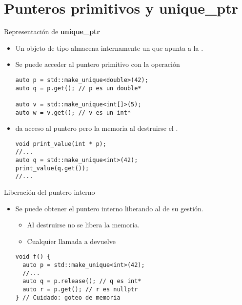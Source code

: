\section{Punteros primitivos y \textbf{unique\_ptr}}

\begin{frame}[t,fragile]{Representación de \textbf{unique\_ptr}}
\begin{itemize}
  \item Un objeto de tipo  almacena internamente
        un  que apunta a
        la .

  \item Se puede acceder al puntero primitivo con la operación 
\begin{lstlisting}
auto p = std::make_unique<double>(42);
auto q = p.get(); // p es un double*

auto v = std::make_unique<int[]>(5);
auto w = v.get(); // v es un int*
\end{lstlisting}


  \item {} da acceso al puntero pero la memoria 
         al destruirse el .
\begin{lstlisting}
void print_value(int * p);
//...
auto q = std::make_unique<int>(42);
print_value(q.get());
//...
\end{lstlisting}

\end{itemize}
\end{frame}

\begin{frame}[t,fragile]{Liberación del puntero interno}
\begin{itemize}
  \item Se puede obtener el puntero interno liberando al  de
        su gestión.
    \begin{itemize}
      \item Al destruirse no se libera la memoria.
      \item Cualquier llamada a  devuelve 
    \end{itemize}
\begin{lstlisting}
void f() {
  auto p = std::make_unique<int>(42);
  //...
  auto q = p.release(); // q es int*
  auto r = p.get(); // r es nullptr
} // Cuidado: goteo de memoria
\end{lstlisting}

\end{itemize}
\end{frame}

